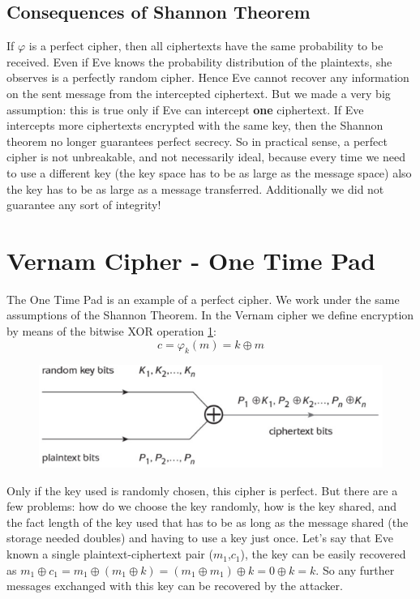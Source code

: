 	\subsection{Consequences of Shannon Theorem}
	
	If $\varphi$ is a perfect cipher, then all ciphertexts have the same probability to be received. Even if Eve knows the probability distribution of the plaintexts, she observes is a perfectly random cipher. Hence Eve cannot recover any information on the sent message from the intercepted ciphertext. But we made a very big assumption: this is true only if Eve can intercept \textbf{one} ciphertext. If Eve intercepts more ciphertexts encrypted with the same key, then the Shannon theorem no longer guarantees perfect secrecy. So in practical sense, a perfect cipher is not unbreakable, and not necessarily ideal, because every time we need to use a different key (the key space has to be as large as the message space) also the key has to be as large as a message transferred. Additionally we did not guarantee any sort of integrity! 

\section{Vernam Cipher - One Time Pad}

The One Time Pad is an example of a perfect cipher. We work under the same assumptions of the Shannon Theorem. In the Vernam cipher we define encryption by means of the bitwise XOR operation \ref{fig:vernam_cipher}:
\[c = \varphi_k (m) = k \oplus m \]

\begin{figure}
	\centering
	\includegraphics[width=0.7\linewidth]{Images/Chapter1/vernam_cipher}
	\caption{}
	\label{fig:vernam_cipher}
\end{figure}

Only if the key used is randomly chosen, this cipher is perfect.
But there are a few problems: how do we choose the key randomly, how is the key shared, and the fact length of the key used that has to be as long as the message shared (the storage needed doubles) and having to use a key just once. Let's say that Eve known a single plaintext-ciphertext pair ($m_1$,$c_1$), the key can be easily recovered as $m_1 \oplus c_1=m_1 \oplus (m_1 \oplus k)=(m_1 \oplus m_1) \oplus k= 0 \oplus k = k$. So any further messages exchanged with this key can be recovered by the attacker.


